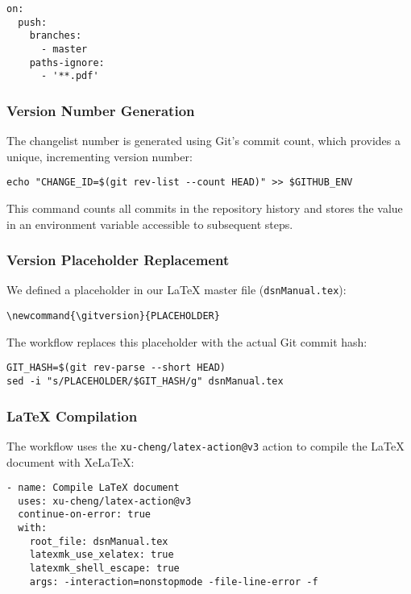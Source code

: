 \begin{verbatim}
on:
  push:
    branches:
      - master
    paths-ignore:
      - '**.pdf'
\end{verbatim}

\subsubsection{Version Number Generation}

The changelist number is generated using Git's commit count, which provides a unique, incrementing version number:

\begin{verbatim}
echo "CHANGE_ID=$(git rev-list --count HEAD)" >> $GITHUB_ENV
\end{verbatim}

This command counts all commits in the repository history and stores the value in an environment variable accessible to subsequent steps.

\subsubsection{Version Placeholder Replacement}

We defined a placeholder in our LaTeX master file (\texttt{dsnManual.tex}):

\begin{verbatim}
\newcommand{\gitversion}{PLACEHOLDER}
\end{verbatim}

The workflow replaces this placeholder with the actual Git commit hash:

\begin{verbatim}
GIT_HASH=$(git rev-parse --short HEAD)
sed -i "s/PLACEHOLDER/$GIT_HASH/g" dsnManual.tex
\end{verbatim}

\subsubsection{LaTeX Compilation}

The workflow uses the \texttt{xu-cheng/latex-action@v3} action to compile the LaTeX document with XeLaTeX:

\begin{verbatim}
- name: Compile LaTeX document
  uses: xu-cheng/latex-action@v3
  continue-on-error: true
  with:
    root_file: dsnManual.tex
    latexmk_use_xelatex: true
    latexmk_shell_escape: true
    args: -interaction=nonstopmode -file-line-error -f
\end{verbatim}

